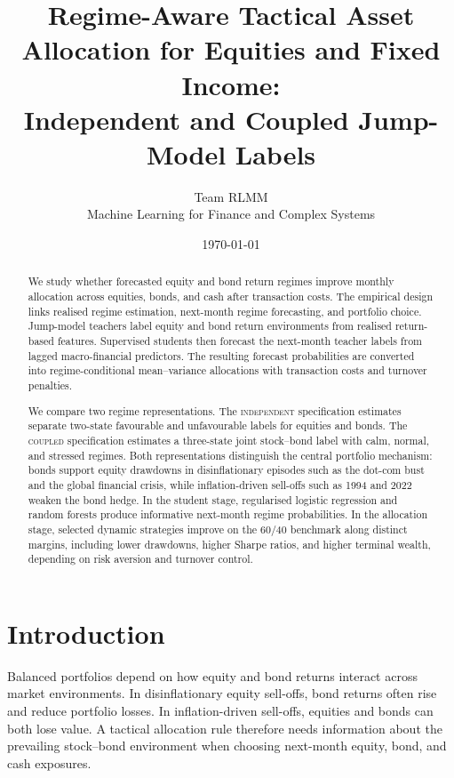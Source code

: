 \documentclass[10pt]{article}
\title{Regime-Aware Tactical Asset Allocation for Equities and Fixed Income:\\
Independent and Coupled Jump-Model Labels}
\author{%
Team RLMM\\
\normalsize Machine Learning for Finance and Complex Systems}
\date{\today}
\newcommand{\Acoup}{\textsc{coupled}}
\newcommand{\Bindep}{\textsc{independent}}
\begin{document}
\maketitle
\thispagestyle{empty}


\begin{abstract}
    \noindent We study whether forecasted equity and bond return regimes improve monthly allocation across equities, bonds, and cash after transaction costs. The empirical design links realised regime estimation, next-month regime forecasting, and portfolio choice. Jump-model teachers label equity and bond return environments from realised return-based features. Supervised students then forecast the next-month teacher labels from lagged macro-financial predictors. The resulting forecast probabilities are converted into regime-conditional mean--variance allocations with transaction costs and turnover penalties.

    \noindent We compare two regime representations. The \Bindep{} specification estimates separate two-state favourable and unfavourable labels for equities and bonds. The \Acoup{} specification estimates a three-state joint stock--bond label with calm, normal, and stressed regimes. Both representations distinguish the central portfolio mechanism: bonds support equity drawdowns in disinflationary episodes such as the dot-com bust and the global financial crisis, while inflation-driven sell-offs such as 1994 and 2022 weaken the bond hedge. In the student stage, regularised logistic regression and random forests produce informative next-month regime probabilities. In the allocation stage, selected dynamic strategies improve on the 60/40 benchmark along distinct margins, including lower drawdowns, higher Sharpe ratios, and higher terminal wealth, depending on risk aversion and turnover control.
\end{abstract}


\section{Introduction}

Balanced portfolios depend on how equity and bond returns interact across market environments. In disinflationary equity sell-offs, bond returns often rise and reduce portfolio losses. In inflation-driven sell-offs, equities and bonds can both lose value. A tactical allocation rule therefore needs information about the prevailing stock--bond environment when choosing next-month equity, bond, and cash exposures.
\end{document}
